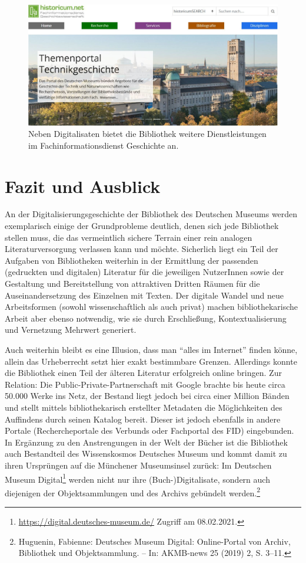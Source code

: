 \documentclass[a4paper,
fontsize=11pt,
oneside,
numbers=noperiodatend,
parskip=half-,
bibliography=totoc,
final
]{scrartcl}
\begin{document}
\begin{figure}
\centering
\includegraphics[width=.70\textwidth]{img/Abb7.jpg}
\caption{Neben Digitalisaten bietet die Bibliothek weitere
Dienstleistungen im Fachinformationsdienst Geschichte an.}
\end{figure}

\hypertarget{fazit-und-ausblick}{%
\section{Fazit und Ausblick}\label{fazit-und-ausblick}}

An der Digitalisierungsgeschichte der Bibliothek des Deutschen Museums
werden exemplarisch einige der Grundprobleme deutlich, denen sich jede
Bibliothek stellen muss, die das vermeintlich sichere Terrain einer rein
analogen Literaturversorgung verlassen kann und möchte. Sicherlich liegt
ein Teil der Aufgaben von Bibliotheken weiterhin in der Ermittlung der
passenden (gedruckten und digitalen) Literatur für die jeweiligen
NutzerInnen sowie der Gestaltung und Bereitstellung von attraktiven
Dritten Räumen für die Auseinandersetzung des Einzelnen mit Texten. Der
digitale Wandel und neue Arbeitsformen (sowohl wissenschaftlich als auch
privat) machen bibliothekarische Arbeit aber ebenso notwendig, wie sie
durch Erschließung, Kontextualisierung und Vernetzung Mehrwert
generiert.

Auch weiterhin bleibt es eine Illusion, dass man \enquote{alles im
Internet} finden könne, allein das Urheberrecht setzt hier exakt
bestimmbare Grenzen. Allerdings konnte die Bibliothek einen Teil der
älteren Literatur erfolgreich online bringen. Zur Relation: Die
Public-Private-Partnerschaft mit Google brachte bis heute circa 50.000
Werke ins Netz, der Bestand liegt jedoch bei circa einer Million Bänden
und stellt mittels bibliothekarisch erstellter Metadaten die
Möglichkeiten des Auffindens durch seinen Katalog bereit. Dieser ist
jedoch ebenfalls in andere Portale (Rechercheportale des Verbunds oder
Fachportal des FID) eingebunden. In Ergänzung zu den Anstrengungen in
der Welt der Bücher ist die Bibliothek auch Bestandteil des
Wissenskosmos Deutsches Museum und kommt damit zu ihren Ursprüngen auf
die Münchener Museumsinsel zurück: Im Deutschen Museum
Digital\footnote{\url{https://digital.deutsches-museum.de/} Zugriff am
  08.02.2021.} werden nicht nur ihre (Buch-)Digitalisate, sondern auch
diejenigen der Objektsammlungen und des Archivs gebündelt
werden.\footnote{Huguenin, Fabienne: Deutsches Museum Digital:
  Online-Portal von Archiv, Bibliothek und Objektsammlung. -- In:
  AKMB-news 25 (2019) 2, S. 3--11.}
\end{document}
